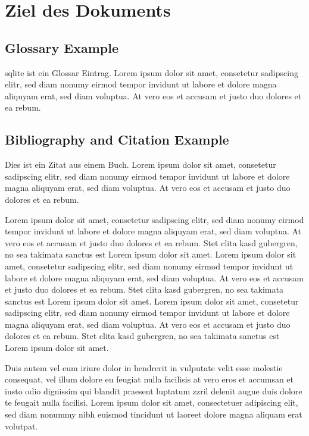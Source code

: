 \chapter*{Ziel des Dokuments}

\section*{Glossary Example}

\gls{sqlite} ist ein Glossar Eintrag. Lorem ipsum dolor sit amet, consetetur sadipscing elitr, sed diam nonumy eirmod tempor invidunt ut labore et dolore magna aliquyam erat, sed diam voluptua. At vero eos et accusam et justo duo dolores et ea rebum.

\section*{Bibliography and Citation Example}

Dies ist ein Zitat aus einem Buch\cite{Matthews201111}. Lorem ipsum dolor sit amet, consetetur sadipscing elitr, sed diam nonumy eirmod tempor invidunt ut labore et dolore magna aliquyam erat, sed diam voluptua. At vero eos et accusam et justo duo dolores et ea rebum.

Lorem ipsum dolor sit amet, consetetur sadipscing elitr, sed diam nonumy eirmod tempor invidunt ut labore et dolore magna aliquyam erat, sed diam voluptua. At vero eos et accusam et justo duo dolores et ea rebum. Stet clita kasd gubergren, no sea takimata sanctus est Lorem ipsum dolor sit amet. Lorem ipsum dolor sit amet, consetetur sadipscing elitr, sed diam nonumy eirmod tempor invidunt ut labore et dolore magna aliquyam erat, sed diam voluptua. At vero eos et accusam et justo duo dolores et ea rebum. Stet clita kasd gubergren, no sea takimata sanctus est Lorem ipsum dolor sit amet. Lorem ipsum dolor sit amet, consetetur sadipscing elitr, sed diam nonumy eirmod tempor invidunt ut labore et dolore magna aliquyam erat, sed diam voluptua. At vero eos et accusam et justo duo dolores et ea rebum. Stet clita kasd gubergren, no sea takimata sanctus est Lorem ipsum dolor sit amet. 

Duis autem vel eum iriure dolor in hendrerit in vulputate velit esse molestie consequat, vel illum dolore eu feugiat nulla facilisis at vero eros et accumsan et iusto odio dignissim qui blandit praesent luptatum zzril delenit augue duis dolore te feugait nulla facilisi. Lorem ipsum dolor sit amet, consectetuer adipiscing elit, sed diam nonummy nibh euismod tincidunt ut laoreet dolore magna aliquam erat volutpat. 

